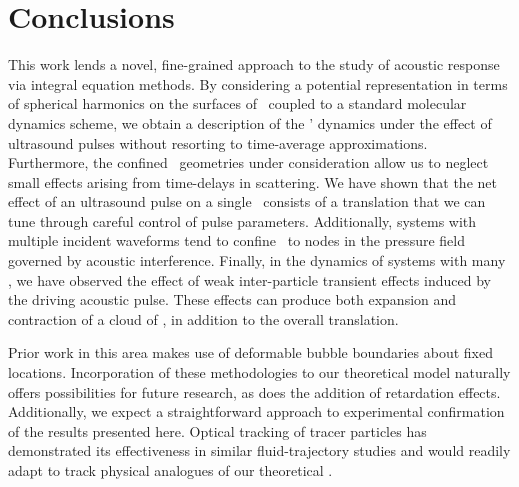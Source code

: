 \section{Conclusions}

This work lends a novel, fine-grained approach to the study of acoustic response via integral equation methods.
By considering a potential representation in terms of spherical harmonics on the surfaces of \bubbles\ coupled to a standard molecular dynamics scheme, we obtain a description of the \bubbles' dynamics under the effect of ultrasound pulses without resorting to time-average approximations.
Furthermore, the confined \bubble\ geometries under consideration allow us to neglect small effects arising from time-delays in scattering.
We have shown that the net effect of an ultrasound pulse on a single \bubble\ consists of a translation that we can tune through careful control of pulse parameters.
Additionally, systems with multiple incident waveforms tend to confine \bubbles\ to nodes in the pressure field governed by acoustic interference.
Finally, in the dynamics of systems with many \bubbles, we have observed the effect of weak inter-particle transient effects induced by the driving acoustic pulse.
These effects can produce both expansion and contraction of a cloud of \bubbles, in addition to the overall translation.

Prior work in this area \cite{Zeravcic2011, Tiwari2015} makes use of deformable bubble boundaries about fixed locations. 
Incorporation of these methodologies to our theoretical model naturally offers possibilities for future research, as does the addition of retardation effects. 
Additionally, we expect a straightforward approach to experimental confirmation of the results presented here. 
Optical tracking of tracer particles\cite{Toschi2009} has demonstrated its effectiveness in similar fluid-trajectory studies and would readily adapt to track physical analogues of our theoretical \bubbles.
